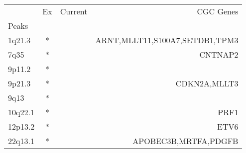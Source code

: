\begin{tabular}{lccr}
\toprule
{} & Ex & Current &                       CGC Genes \\
Peaks   &    &         &                                 \\
\midrule
1q21.3  &  * &         &  ARNT,MLLT11,S100A7,SETDB1,TPM3 \\
7q35    &  * &         &                         CNTNAP2 \\
9p11.2  &  * &         &                                 \\
9p21.3  &  * &         &                    CDKN2A,MLLT3 \\
9q13    &  * &         &                                 \\
10q22.1 &  * &         &                            PRF1 \\
12p13.2 &  * &         &                            ETV6 \\
22q13.1 &  * &         &            APOBEC3B,MRTFA,PDGFB \\
\bottomrule
\end{tabular}
